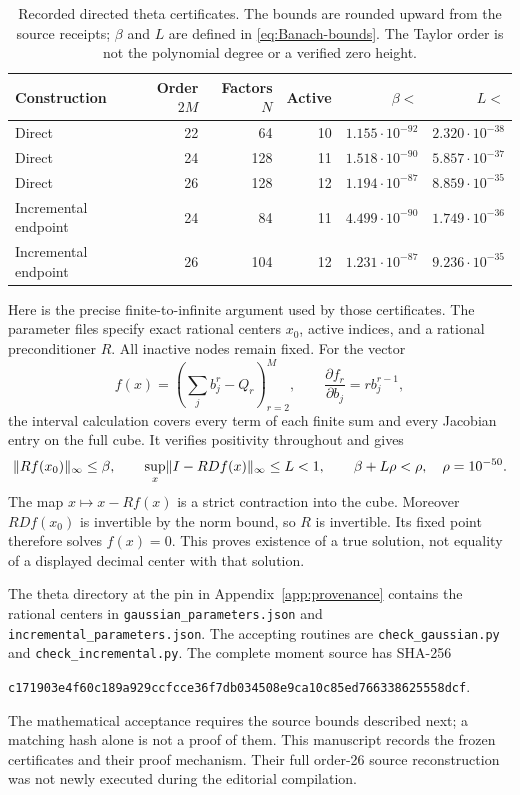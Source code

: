 \begin{table}[ht]
\centering
\caption{Recorded directed theta certificates. The bounds are rounded upward from the source receipts; $\beta$ and $L$ are defined in \eqref{eq:Banach-bounds}. The Taylor order is not the polynomial degree or a verified zero height.}\label{tab:theta-certificates}
\small
\begin{tabular}{lrrrrr}
\toprule
Construction & Order $2M$ & Factors $N$ & Active & $\beta<$ & $L<$\\
\midrule
Direct &22&64&10&$1.155\cdot10^{-92}$&$2.320\cdot10^{-38}$\\
Direct &24&128&11&$1.518\cdot10^{-90}$&$5.857\cdot10^{-37}$\\
Direct &26&128&12&$1.194\cdot10^{-87}$&$8.859\cdot10^{-35}$\\
Incremental endpoint &24&84&11&$4.499\cdot10^{-90}$&$1.749\cdot10^{-36}$\\
Incremental endpoint &26&104&12&$1.231\cdot10^{-87}$&$9.236\cdot10^{-35}$\\
\bottomrule
\end{tabular}
\end{table}

Here is the precise finite-to-infinite argument used by those certificates. The parameter files specify exact rational centers $x_0$, active indices, and a rational preconditioner $R$. All inactive nodes remain fixed. For the vector
\[
 f(x)=\left(\sum_jb_j^r-Q_r\right)_{r=2}^M,
 \qquad \frac{\partial f_r}{\partial b_j}=r b_j^{r-1},
\]
the interval calculation covers every term of each finite sum and every Jacobian entry on the full cube. It verifies positivity throughout and gives
\begin{equation}\label{eq:Banach-bounds}
 \lVert Rf(x_0)\rVert_\infty\le\beta,\qquad
 \sup_x\lVert I-RDf(x)\rVert_\infty\le L<1,\qquad
 \beta+L\rho<\rho,
 \quad \rho=10^{-50}.
\end{equation}
The map $x\mapsto x-Rf(x)$ is a strict contraction into the cube. Moreover $RDf(x_0)$ is invertible by the norm bound, so $R$ is invertible. Its fixed point therefore solves $f(x)=0$. This proves existence of a true solution, not equality of a displayed decimal center with that solution.

The theta directory at the pin in Appendix~\ref{app:provenance} contains the rational centers in \nolinkurl{gaussian_parameters.json} and \nolinkurl{incremental_parameters.json}. The accepting routines are \nolinkurl{check_gaussian.py} and \nolinkurl{check_incremental.py}. The complete moment source has SHA-256
\begin{center}\footnotesize\texttt{c171903e4f60c189a929ccfcce36f7db034508e9ca10c85ed766338625558dcf}.
\end{center}
The mathematical acceptance requires the source bounds described next; a matching hash alone is not a proof of them. This manuscript records the frozen certificates and their proof mechanism. Their full order-26 source reconstruction was not newly executed during the editorial compilation.

